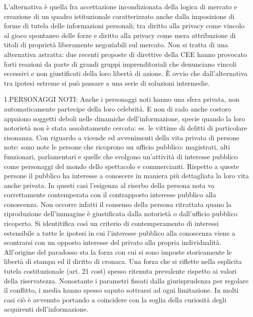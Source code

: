 L’alternativa è quella fra accettazione incondizionata della logica di mercato e creazione di un quadro istituzionale caratterizzato anche dalla imposizione di forme di tutela delle informazioni personali; tra diritto alla privacy come vincolo al gioco spontaneo delle forze e diritto alla privacy come mera attribuzione di titoli di proprietà liberamente negoziabili sul mercato.
Non si tratta di una alternativa astratta: due recenti proposte di direttive della CEE hanno provocato forti reazioni da parte di grandi gruppi imprenditoriali che denunciano vincoli eccessivi e non giustificati della loro libertà di azione.
È ovvio che dall’alternativa tra ipotesi estreme si può passare a una serie di soluzioni intermedie.




1.PERSONAGGI NOTI:
Anche i personaggi noti hanno una sfera privata, non automaticamente partecipe della loro celebrità. E non di rado anche costoro appaiono soggetti deboli nelle dinamiche dell'informazione, specie quando la loro notorietà non è stata assolutamente cercata: es. le vittime di delitti di particolare risonanza.
Con riguardo a vicende ed avvenimenti della vita privata di persone note: sono note le persone che ricoprono un ufficio pubblico: magistrati, alti funzionari, parlamentari e quelle che svolgono un'attività di interesse pubblico come personaggi del mondo dello spettacolo e commercianti. Rispetto a queste persone il pubblico ha interesse a conoscere in maniera più dettagliata la loro vita anche privata.
In questi casi l'esigenza al riserbo della persona nota va correttamente contemperata con il contrapposto interesse pubblico alla conoscenza.
Non occorre infatti il consenso della persona ritrattata quano la riproduzione dell'immagine è giustificata dalla notorietà o dall'ufficio pubblico ricoperto. Si identitifica così un criterio di contemperamento di interessi estensibile a tutte le ipotesi in cui l'interesse pubblico alla conoscenza viene a scontrarsi con un opposto interesse del privato alla propria individualità.
All'origine del paradosso sta la forza con cui si sono imposte storicamente le libertà di stampa ed il diritto di cronaca. Una forza che si riflette nella esplicita tutela costituzionale (art. 21 cost) spesso ritenuta prevalente rispetto ai valori della riservatezza.
Nonostante i parametri fissati dalla giurisprudenza per regolare il conflitto, i media hanno spesso saputo sottrarsi ad ogni limitazione. In molti casi ciò è avvenuto portando a coincidere con la soglia della curiosità degli acquirenti dell'informazione.

